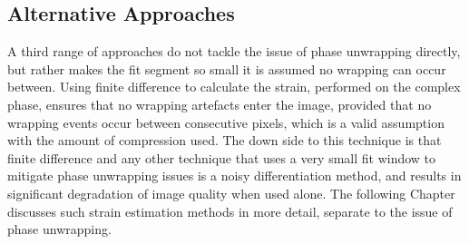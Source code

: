 \subsection{Alternative Approaches}
A third range of approaches do not tackle the issue of phase unwrapping directly, but rather makes the fit segment so small it is assumed no wrapping can occur between. Using finite difference to calculate the strain, performed on the complex phase, ensures that no wrapping artefacts enter the image, provided that no wrapping events occur between consecutive pixels, which is a valid assumption with the amount of compression used. The down side to this technique is that finite difference and any other technique that uses a very small fit window to mitigate phase unwrapping issues is a noisy differentiation method, and results in significant degradation of image quality when used alone. The following Chapter discusses such strain estimation methods in more detail, separate to the issue of phase unwrapping.


